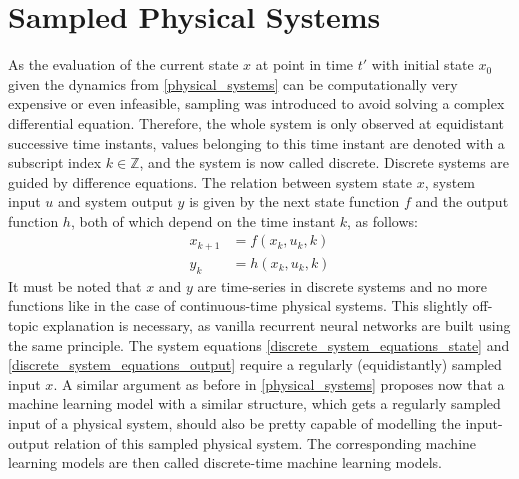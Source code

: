 \documentclass[draft,final]{vutinfth} %
\begin{document}
    \section{Sampled Physical Systems} \label{sampled_physical_systems}
    As the evaluation of the current state $x$ at point in time $t'$ with initial state $x_0$ given the dynamics from \ref{physical_systems} can be computationally very expensive or even infeasible, sampling was introduced to avoid solving a complex differential equation.
    Therefore, the whole system is only observed at equidistant successive time instants, values belonging to this time instant are denoted with a subscript index $k \in \mathbb{Z}$, and the system is now called discrete.
    Discrete systems are guided by difference equations. The relation between system state $x$, system input $u$ and system output $y$ is given by the next state function $f$ and the output function $h$, both of which depend on the time instant $k$, as follows:
    \begin{align} 
        \label{discrete_system_equations_state}
        x_{k+1} &= f(x_k,u_k,k) \\
        \label{discrete_system_equations_output}
        y_k &= h(x_k,u_k,k)
    \end{align} 
    It must be noted that $x$ and $y$ are time-series in discrete systems and no more functions like in the case of continuous-time physical systems.
    This slightly off-topic explanation is necessary, as vanilla recurrent neural networks are built using the same principle. 
    The system equations \ref{discrete_system_equations_state} and \ref{discrete_system_equations_output} require a regularly (equidistantly) sampled input $x$.
    A similar argument as before in \ref{physical_systems} proposes now that a machine learning model with a similar structure, which gets a regularly sampled input of a physical system, should also be pretty capable of modelling the input-output relation of this sampled physical system.
    The corresponding machine learning models are then called discrete-time machine learning models.
    
\end{document}
